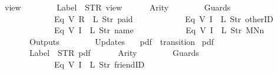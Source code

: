 \begin{isabellebody}
{\isachardoublequoteopen}view{}\ {\isasymequiv}\ {\isasymlparr}\isanewline
\ \ \ \ \ \ Label\ {\isacharequal}\ STR\ {\isacharprime}{\isacharprime}view{\isacharprime}{\isacharprime}{\isacharcomma}\isanewline
\ \ \ \ \ \ Arity\ {\isacharequal}\ {}{\isacharcomma}\isanewline
\ \ \ \ \ \ Guards\ {\isacharequal}\ {\isacharbrackleft}\isanewline
\ \ \ \ \ \ \ \ \ \ \ \ Eq\ {\isacharparenleft}V\ {\isacharparenleft}R\ {}{\isacharparenright}{\isacharparenright}\ {\isacharparenleft}L\ {\isacharparenleft}Str\ {\isacharprime}{\isacharprime}paid{\isacharprime}{\isacharprime}{\isacharparenright}{\isacharparenright}{\isacharcomma}\isanewline
\ \ \ \ \ \ \ \ \ \ \ \ Eq\ {\isacharparenleft}V\ {\isacharparenleft}I\ {}{\isacharparenright}{\isacharparenright}\ {\isacharparenleft}L\ {\isacharparenleft}Str\ {\isacharprime}{\isacharprime}otherID{\isacharprime}{\isacharprime}{\isacharparenright}{\isacharparenright}{\isacharcomma}\isanewline
\ \ \ \ \ \ \ \ \ \ \ \ Eq\ {\isacharparenleft}V\ {\isacharparenleft}I\ {}{\isacharparenright}{\isacharparenright}\ {\isacharparenleft}L\ {\isacharparenleft}Str\ {\isacharprime}{\isacharprime}name{\isacharprime}{\isacharprime}{\isacharparenright}{\isacharparenright}{\isacharcomma}\isanewline
\ \ \ \ \ \ \ \ \ \ \ \ Eq\ {\isacharparenleft}V\ {\isacharparenleft}I\ {}{\isacharparenright}{\isacharparenright}\ {\isacharparenleft}L\ {\isacharparenleft}Str\ {\isacharprime}{\isacharprime}MNn{}{\isacharprime}{\isacharprime}{\isacharparenright}{\isacharparenright}\isanewline
\ \ \ \ \ \ {\isacharbrackright}{\isacharcomma}\isanewline
\ \ \ \ \ \ Outputs\ {\isacharequal}\ {\isacharbrackleft}{\isacharbrackright}{\isacharcomma}\isanewline
\ \ \ \ \ \ Updates\ {\isacharequal}\ {\isacharbrackleft}{\isacharbrackright}\isanewline
{\isasymrparr}{\isachardoublequoteclose}\isanewline
\isanewline
{}\isamarkupfalse%
\ {\isachardoublequoteopen}pdf{\isachardoublequoteclose}\ {\isacharcolon}{\isacharcolon}\ {\isachardoublequoteopen}transition{\isachardoublequoteclose}\ \isanewline
{\isachardoublequoteopen}pdf\ {\isasymequiv}\ {\isasymlparr}\isanewline
\ \ \ \ \ \ Label\ {\isacharequal}\ STR\ {\isacharprime}{\isacharprime}pdf{\isacharprime}{\isacharprime}{\isacharcomma}\isanewline
\ \ \ \ \ \ Arity\ {\isacharequal}\ {}{\isacharcomma}\isanewline
\ \ \ \ \ \ Guards\ {\isacharequal}\ {\isacharbrackleft}\isanewline
\ \ \ \ \ \ \ \ \ \ \ \ Eq\ {\isacharparenleft}V\ {\isacharparenleft}I\ {}{\isacharparenright}{\isacharparenright}\ {\isacharparenleft}L\ {\isacharparenleft}Str\ {\isacharprime}{\isacharprime}friendID{\isacharprime}{\isacharprime}{\isacharparenright}{\isacharparenright}{\isacharcomma}\isanewline

\end{isabellebody}
